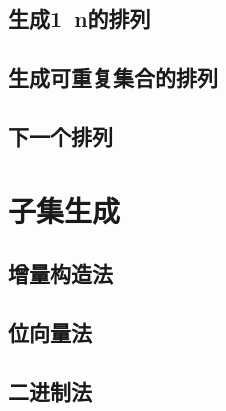 \subsection{生成1~n的排列}

\subsection{生成可重复集合的排列}

\subsection{下一个排列}

\section{子集生成} %

\subsection{增量构造法}

\subsection{位向量法}

\subsection{二进制法}
